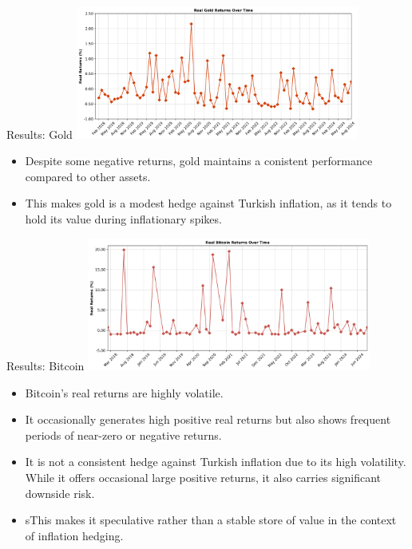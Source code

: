 \documentclass{beamer}
\begin{document}
\begin{frame}{Results: Gold}
\includegraphics[width=0.7\textwidth]{real_gold_returns.png}
\begin{itemize}
\item Despite some negative returns, gold maintains a conistent performance compared to other assets.
\item This makes gold is a modest hedge against Turkish inflation, as it tends to hold its value during inflationary spikes. 
\end{itemize}
\end{frame}

\begin{frame}{Results: Bitcoin}
\includegraphics[width=0.7\textwidth]{real_bitcoin_returns.png}
\begin{itemize}
\item Bitcoin's real returns are highly volatile.
\item It occasionally generates high positive real returns but also shows frequent periods of near-zero or negative returns.
\item It is not a consistent hedge against Turkish inflation due to its high volatility. While it offers occasional large positive returns, it also carries significant downside risk.
\item sThis makes it speculative rather than a stable store of value in the context of inflation hedging.
\end{itemize}
\end{frame}
\end{document}
